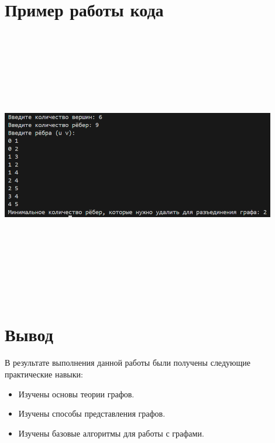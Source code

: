 \documentclass[12pt]{article}
\begin{document}
\section*{Пример работы кода}
 \includegraphics[width=0.9\textwidth, height=12cm, keepaspectratio]{res.png}
\section*{Вывод}

В результате выполнения данной работы были получены следующие практические навыки:

\begin{itemize}
    \item Изучены основы теории графов.
    \item Изучены способы представления графов.
    \item Изучены базовые алгоритмы для работы с графами.
\end{itemize}
\end{document}
